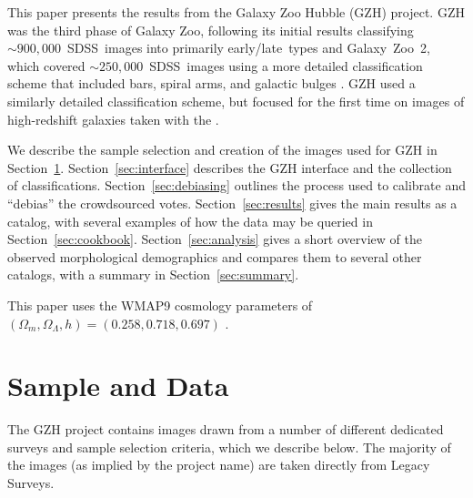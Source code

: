 \documentclass[usenatbib]{mn2e}
\begin{document}
This paper presents the results from the Galaxy Zoo Hubble (GZH) project. GZH was the third phase of Galaxy Zoo, following its initial results classifying $\sim900,000$~SDSS~images into primarily early/late~types \citep{lin11} and Galaxy~Zoo~2, which covered $\sim250,000$~SDSS~images using a more detailed classification scheme that included bars, spiral arms, and galactic bulges \citep{wil13}. GZH used a similarly detailed classification scheme, but focused for the first time on images of high-redshift galaxies taken with the \hubble.

We describe the sample selection and creation of the images used for GZH in Section~\ref{sec:data}. Section~\ref{sec:interface} describes the GZH interface and the collection of classifications. Section~\ref{sec:debiasing} outlines the process used to calibrate and ``debias'' the crowdsourced votes. Section~\ref{sec:results} gives the main results as a catalog, with several examples of how the data may be queried in Section~\ref{sec:cookbook}. Section~\ref{sec:analysis} gives a short overview of the observed morphological demographics and compares them to several other catalogs, with a summary in Section~\ref{sec:summary}.

This paper uses the WMAP9 cosmology parameters of $(\Omega_m,\Omega_\Lambda,h)=(0.258,0.718,0.697)$ \citep{hin13}.


\section{Sample and Data}\label{sec:data}

The GZH project contains images drawn from a number of different dedicated surveys and sample selection criteria, which we describe below. The majority of the images (as implied by the project name) are taken directly from \hst{} Legacy Surveys.
\end{document}
